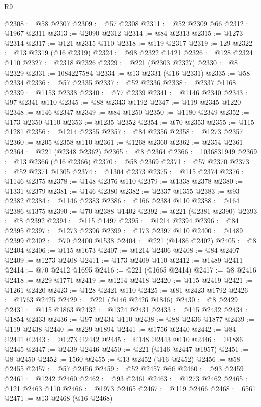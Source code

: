 \begin{lexlean}{R9}
\begin{coremodule}
@2308 := @58 @2307
@2309 := @57 @2308
@2311 := @52 @2309 @66
@2312 := @1967 @2311
@2313 := @2090 @2312
@2314 := @84 @2313
@2315 := @1273 @2314
@2317 := @121 @2315 @110
@2318 := @119 @2317
@2319 := 129
@2322 := @13 @2319 (@16 @2319)
@2324 := @98 @2322 @1421
@2326 := @128 @2324 @110
@2327 := @2318 @2326
@2329 := @221 (@2303 @2327)
@2330 := @8 @2329
@2331 := 1084227584
@2334 := @13 @2331 (@16 @2331)
@2335 := @58 @2334
@2336 := @57 @2335
@2337 := @52 @2336
@2338 := @2337 @1168
@2339 := @1153 @2338
@2340 := @77 @2339
@2341 := @1146 @2340
@2343 := @97 @2341 @110
@2345 := @88 @2343 @1192
@2347 := @119 @2345 @1220
@2348 := @146 @2347
@2349 := @84 @1250
@2350 := @1180 @2349
@2352 := @173 @2350 @110
@2353 := @1235 @2352
@2354 := @70 @2353
@2355 := @115 @1281
@2356 := @1214 @2355
@2357 := @84 @2356
@2358 := @1273 @2357
@2360 := @205 @2358 @110
@2361 := @1268 @2360
@2362 := @2354 @2361
@2364 := @221 (@2348 @2362)
@2365 := @8 @2364
@2366 := 1036831949
@2369 := @13 @2366 (@16 @2366)
@2370 := @58 @2369
@2371 := @57 @2370
@2373 := @52 @2371 @1305
@2374 := @1304 @2373
@2375 := @115 @2374
@2376 := @1146 @2375
@2378 := @148 @2376 @110
@2379 := @1338 @2378
@2380 := @1331 @2379
@2381 := @146 @2380
@2382 := @2337 @1355
@2383 := @93 @2382
@2384 := @1146 @2383
@2386 := @166 @2384 @110
@2388 := @164 @2386 @1375
@2390 := @70 @2388 @1402
@2392 := @221 (@2381 @2390)
@2393 := @8 @2392
@2394 := @115 @1497
@2395 := @1214 @2394
@2396 := @84 @2395
@2397 := @1273 @2396
@2399 := @173 @2397 @110
@2400 := @1489 @2399
@2402 := @70 @2400 @1538
@2404 := @221 (@1486 @2402)
@2405 := @8 @2404
@2406 := @115 @1673
@2407 := @1214 @2406
@2408 := @84 @2407
@2409 := @1273 @2408
@2411 := @173 @2409 @110
@2412 := @1489 @2411
@2414 := @70 @2412 @1695
@2416 := @221 (@1665 @2414)
@2417 := @8 @2416
@2418 := @229 @1771
@2419 := @1214 @2418
@2420 := @115 @2419
@2421 := @1261 @2420
@2423 := @128 @2421 @110
@2425 := @81 @2423 @1792
@2426 := @1763 @2425
@2429 := @221 (@146 @2426 @1846)
@2430 := @8 @2429
@2431 := @115 @1863
@2432 := @1324 @2431
@2433 := @115 @2432
@2434 := @1854 @2433
@2436 := @97 @2434 @110
@2438 := @88 @2436 @1877
@2439 := @119 @2438
@2440 := @229 @1894
@2441 := @1756 @2440
@2442 := @84 @2441
@2443 := @1273 @2442
@2445 := @148 @2443 @110
@2446 := @1886 @2445
@2447 := @2439 @2446
@2450 := @221 (@146 @2447 @1957)
@2451 := @8 @2450
@2452 := 1560
@2455 := @13 @2452 (@16 @2452)
@2456 := @58 @2455
@2457 := @57 @2456
@2459 := @52 @2457 @66
@2460 := @93 @2459
@2461 := @1242 @2460
@2462 := @93 @2461
@2463 := @1273 @2462
@2465 := @121 @2463 @110
@2466 := @1973 @2465
@2467 := @119 @2466
@2468 := 6561
@2471 := @13 @2468 (@16 @2468)

\end{coremodule}
\end{lexlean}
